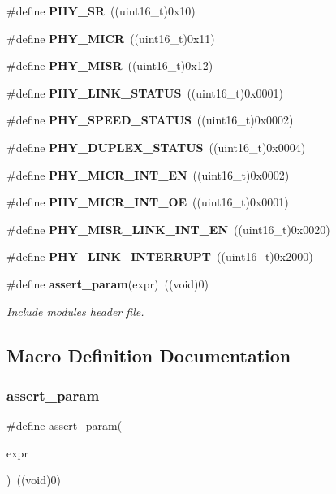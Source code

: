 \begin{DoxyCompactItemize}
\item 
\#define \textbf{ P\+H\+Y\+\_\+\+SR}~((uint16\+\_\+t)0x10)
\item 
\#define \textbf{ P\+H\+Y\+\_\+\+M\+I\+CR}~((uint16\+\_\+t)0x11)
\item 
\#define \textbf{ P\+H\+Y\+\_\+\+M\+I\+SR}~((uint16\+\_\+t)0x12)
\item 
\#define \textbf{ P\+H\+Y\+\_\+\+L\+I\+N\+K\+\_\+\+S\+T\+A\+T\+US}~((uint16\+\_\+t)0x0001)
\item 
\#define \textbf{ P\+H\+Y\+\_\+\+S\+P\+E\+E\+D\+\_\+\+S\+T\+A\+T\+US}~((uint16\+\_\+t)0x0002)
\item 
\#define \textbf{ P\+H\+Y\+\_\+\+D\+U\+P\+L\+E\+X\+\_\+\+S\+T\+A\+T\+US}~((uint16\+\_\+t)0x0004)
\item 
\#define \textbf{ P\+H\+Y\+\_\+\+M\+I\+C\+R\+\_\+\+I\+N\+T\+\_\+\+EN}~((uint16\+\_\+t)0x0002)
\item 
\#define \textbf{ P\+H\+Y\+\_\+\+M\+I\+C\+R\+\_\+\+I\+N\+T\+\_\+\+OE}~((uint16\+\_\+t)0x0001)
\item 
\#define \textbf{ P\+H\+Y\+\_\+\+M\+I\+S\+R\+\_\+\+L\+I\+N\+K\+\_\+\+I\+N\+T\+\_\+\+EN}~((uint16\+\_\+t)0x0020)
\item 
\#define \textbf{ P\+H\+Y\+\_\+\+L\+I\+N\+K\+\_\+\+I\+N\+T\+E\+R\+R\+U\+PT}~((uint16\+\_\+t)0x2000)
\item 
\#define \textbf{ assert\+\_\+param}(expr)~((void)0)
\begin{DoxyCompactList}\small\item\em Include module\textquotesingle{}s header file. \end{DoxyCompactList}\end{DoxyCompactItemize}


\subsection{Macro Definition Documentation}
\mbox{\label{stm32f4xx__hal__conf_8h_a631dea7b230e600555f979c62af1de21}} 
\subsubsection{assert\+\_\+param}
{\footnotesize\ttfamily \#define assert\+\_\+param(\begin{DoxyParamCaption}\item[{}]{expr }\end{DoxyParamCaption})~((void)0)}



